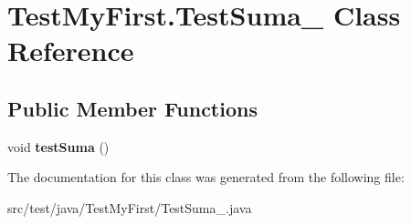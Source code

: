 \hypertarget{class_test_my_first_1_1_test_suma__2}{}\section{Test\+My\+First.\+Test\+Suma\+\_ Class Reference}
\label{class_test_my_first_1_1_test_suma__2}
\subsection*{Public Member Functions}
\begin{DoxyCompactItemize}
\item 
\mbox{\label{class_test_my_first_1_1_test_suma__2_a89edcafb2ea09f49952271df193ffda7}} 
void {\bfseries test\+Suma} ()
\end{DoxyCompactItemize}


The documentation for this class was generated from the following file\+:\begin{DoxyCompactItemize}
\item 
src/test/java/\+Test\+My\+First/Test\+Suma\+\_.\+java\end{DoxyCompactItemize}
